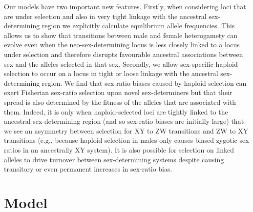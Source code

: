 \documentclass[12pt]{article}
\begin{document}
Our models have two important new features. 
Firstly, when considering loci that are under selection and also in very tight linkage with the ancestral sex-determining region we explicitly calculate equilibrium allele frequencies.
This allows us to show that transitions between male and female heterogamety can evolve even when the neo-sex-determining locus is less closely linked to a locus under selection and therefore disrupts favourable ancestral associations between sex and the alleles selected in that sex.
Secondly, we allow sex-specific haploid selection to occur on a locus in tight or loose linkage with the ancestral sex-determining region. 
We find that sex-ratio biases caused by haploid selection can exert Fisherian sex-ratio selection upon novel sex-determiners but that their spread is also determined by the fitness of the alleles that are associated with them. 
Indeed, it is only when haploid-selected loci are tightly linked to the ancestral sex-determining region (and so sex-ratio biases are initially large) that we see an asymmetry between selection for XY to ZW transitions and ZW to XY transitions (e.g., because haploid selection in males only causes biased zygotic sex ratios in an ancestrally XY system).
It is also possible for selection on linked alleles to drive turnover between sex-determining systems despite causing transitory or even permanent increases in sex-ratio bias. 

\section*{Model}
\end{document}
